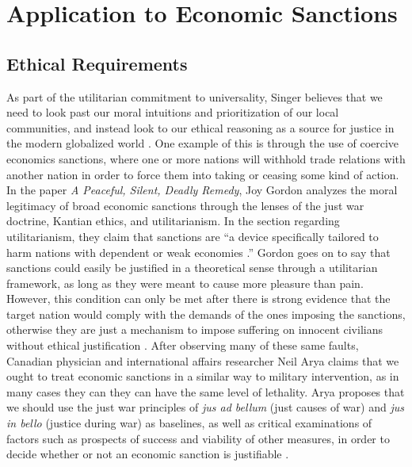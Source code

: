 \documentclass[12pt]{article}
\begin{document}
\section*{Application to Economic Sanctions}
\subsection*{Ethical Requirements}
As part of the utilitarian commitment to universality, Singer believes that we need to look past our moral intuitions and prioritization of our local communities, and instead look to our ethical reasoning as a source for justice in the modern globalized world \autocite[14]{singer2016}.
One example of this is through the use of coercive economics sanctions, where one or more nations will withhold trade relations with another nation in order to force them into taking or ceasing some kind of action.
In the paper \textit{A Peaceful, Silent, Deadly Remedy}, Joy Gordon analyzes the moral legitimacy of broad economic sanctions through the lenses of the just war doctrine, Kantian ethics, and utilitarianism.
In the section regarding utilitarianism, they claim that sanctions are ``a device specifically tailored to harm nations with dependent or weak economies \autocite[135]{gordon1999}.''
Gordon goes on to say that sanctions could easily be justified in a theoretical sense through a utilitarian framework, as long as they were meant to cause more pleasure than pain.
However, this condition can only be met after there is strong evidence that the target nation would comply with the demands of the ones imposing the sanctions, otherwise they are just a mechanism to impose suffering on innocent civilians without ethical justification \autocite[137]{gordon1999}.
After observing many of these same faults, Canadian physician and international affairs researcher Neil Arya claims that we ought to treat economic sanctions in a similar way to military intervention, as in many cases they can they can have the same level of lethality.
Arya proposes that we should use the just war principles of \textit{jus ad bellum} (just causes of war) and \textit{jus in bello} (justice during war) as baselines, as well as critical examinations of factors such as prospects of success and viability of other measures, in order to decide whether or not an economic sanction is justifiable \autocite[35]{arya2008}.
\end{document}
